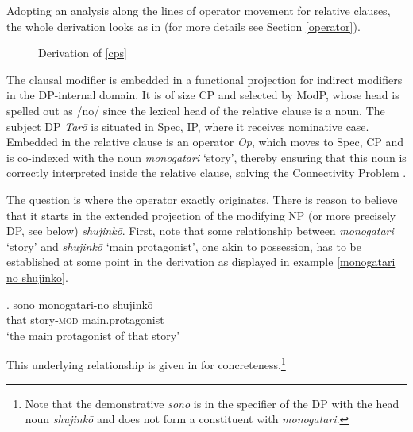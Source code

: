 Adopting an analysis along the lines of operator movement for relative clauses, the whole derivation looks as in  (for more details see Section \ref{operator}).

 \begin{figure}[t]
\caption{Derivation of \ref{cps}}
\label{Derivation shujinko-no monogatari}
\end{figure}

The clausal modifier is embedded in a functional projection for indirect modifiers in the DP-internal domain. It is of size CP and selected by ModP, whose head is spelled out as /no/ since the lexical head of the relative clause is a noun. The subject DP \textit{Tarō} is situated in Spec, IP, where it receives nominative case. Embedded in the relative clause is an operator \textit{Op}, which moves to Spec, CP and is co-indexed with the noun \textit{monogatari} `story’, thereby ensuring that this noun is correctly interpreted inside the relative clause, solving the Connectivity Problem \citep{salzmann:2017:reconstruction}.

The question is where the operator exactly originates. There is reason to believe that it starts in the extended projection of the modifying NP (or more precisely DP, see below) \textit{shujinkō}. First, note that some relationship between \textit{monogatari} `story’ and \textit{shujinkō} `main protagonist’, one akin to possession, has to be established at some point in the derivation as displayed in example \ref{monogatari no shujinko}. 

\exg. sono monogatari-no shujinkō\\
that story-\textsc{mod} main.protagonist\\
`the main protagonist of that story’ \label{monogatari no shujinko}

This underlying relationship is given in  for concreteness.\footnote{Note that the demonstrative \textit{sono} is in the specifier of the DP with the head noun \textit{shujinkō} and does not form a constituent with \textit{monogatari}.}

